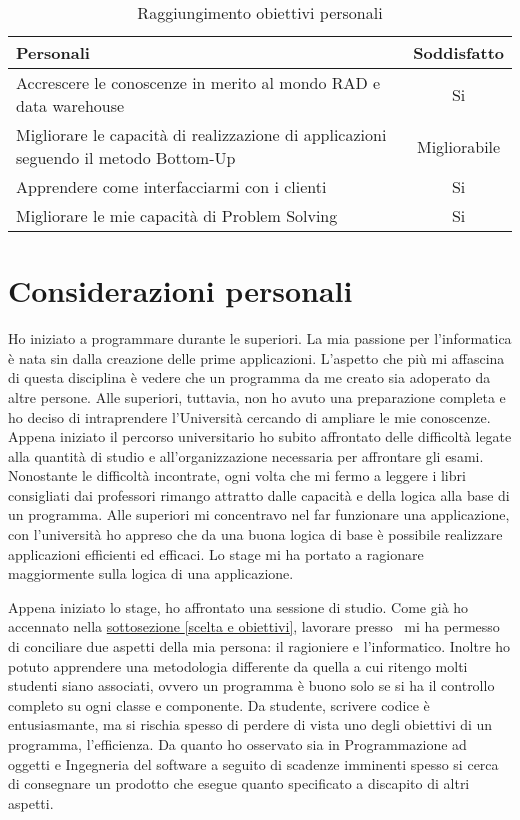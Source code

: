 \begin{table}[h]
	\begin{tabular}{p{10cm}|c}
		\hline
		\textbf{Personali}& \textbf{Soddisfatto} \\
		\hline
		Accrescere le conoscenze in merito al mondo RAD e data warehouse & Si\\
		Migliorare le capacità di realizzazione di applicazioni seguendo il metodo Bottom-Up & Migliorabile\\
		Apprendere come interfacciarmi con i clienti & Si\\
		Migliorare le mie capacità di Problem Solving & Si

	\end{tabular}
\caption{Raggiungimento obiettivi personali}
\end{table}


\section{Considerazioni personali}
Ho iniziato a programmare durante le superiori. La mia passione per l'informatica è nata sin dalla creazione delle prime applicazioni. L'aspetto che più mi affascina di questa disciplina è vedere che un programma da me creato sia adoperato da altre persone. Alle superiori, tuttavia, non ho avuto una preparazione completa e ho deciso di intraprendere l'Università cercando di ampliare le mie conoscenze. Appena iniziato il percorso universitario ho subito affrontato delle difficoltà legate alla quantità di studio e all'organizzazione necessaria per affrontare gli esami. Nonostante le difficoltà incontrate, ogni volta che mi fermo a leggere i libri consigliati dai professori rimango attratto dalle capacità e della logica alla base di un programma. 
Alle superiori mi concentravo nel far funzionare una applicazione, con l'università ho appreso che da una buona logica di base è possibile realizzare applicazioni efficienti ed efficaci. Lo stage mi ha portato a ragionare maggiormente sulla logica di una applicazione.

Appena iniziato lo stage, ho affrontato una sessione di studio. Come già ho accennato nella \hyperref[scelta e obiettivi]{sottosezione \ref{scelta e obiettivi}}, lavorare presso \azienda\ mi ha permesso di conciliare due aspetti della mia persona: il ragioniere e l'informatico. Inoltre ho potuto apprendere una metodologia differente da quella a cui ritengo molti studenti siano associati, ovvero un programma è buono solo se si ha il controllo completo su ogni classe e componente. 
Da studente, scrivere codice è entusiasmante, ma si rischia spesso di perdere di vista uno degli obiettivi di un programma, l'efficienza. Da quanto ho osservato sia in Programmazione ad oggetti e Ingegneria del software a seguito di scadenze imminenti spesso si cerca di consegnare un prodotto che esegue quanto specificato a discapito di altri aspetti.

